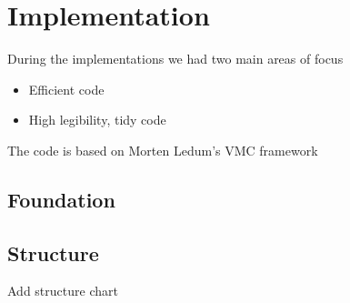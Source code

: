 \chapter{Implementation} \label{sec:implementation}
During the implementations we had two main areas of focus
\begin{itemize}
	\item Efficient code
	\item High legibility, tidy code
\end{itemize}

The code is based on Morten Ledum's VMC framework

\section{Foundation} \label{subsec:foundation}
\section{Structure} \label{subsec:structure}
Add structure chart
